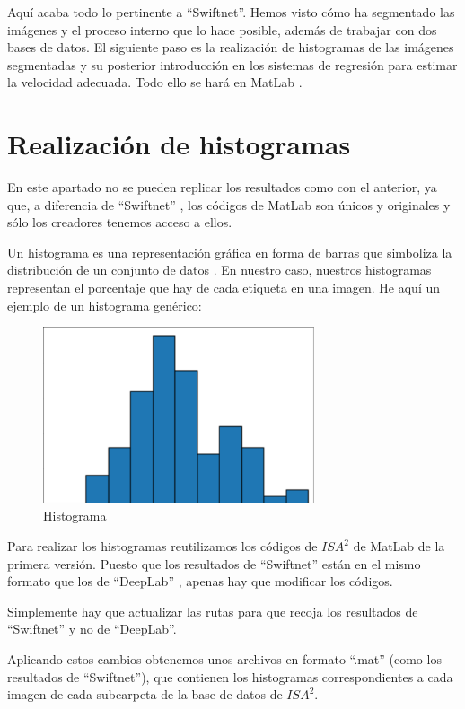 Aquí acaba todo lo pertinente a ``Swiftnet''. Hemos visto cómo ha segmentado las imágenes y el proceso interno que lo hace posible, además de trabajar con dos bases de datos. El siguiente paso es la realización de histogramas de las imágenes segmentadas y su posterior introducción en los sistemas de regresión para estimar la velocidad adecuada. Todo ello se hará en MatLab \cite{matlab}.

\section{Realización de histogramas}

En este apartado no se pueden replicar los resultados como con el anterior, ya que, a diferencia de ``Swiftnet'' \cite{swiftnet}, los códigos de MatLab \cite{matlab} son únicos y originales y sólo los creadores tenemos acceso a ellos.

Un histograma es una representación gráfica en forma de barras que simboliza la distribución de un conjunto de datos \cite{histograma}. En nuestro caso, nuestros histogramas representan el porcentaje que hay de cada etiqueta en una imagen. He aquí un ejemplo de un histograma genérico:

\begin{figure}[H]
  \centering
  \includegraphics[width=8cm]{Figuras/histograma.eps}
  \caption{Histograma}
\end{figure}

Para realizar los histogramas reutilizamos los códigos de $ISA^{2}$ \cite{isa2} de MatLab de la primera versión. Puesto que los resultados de ``Swiftnet'' están en el mismo formato que los de ``DeepLab'' \cite{deeplab}, apenas hay que modificar los códigos.

Simplemente hay que actualizar las rutas para que recoja los resultados de ``Swiftnet'' y no de ``DeepLab''.

Aplicando estos cambios obtenemos unos archivos en formato ``.mat'' (como los resultados de ``Swiftnet''), que contienen los histogramas correspondientes a cada imagen de cada subcarpeta de la base de datos de $ISA^{2}$.

